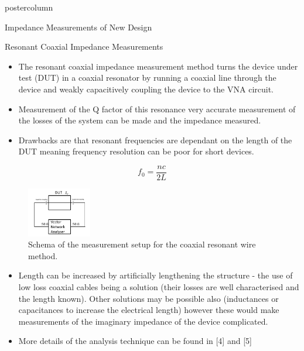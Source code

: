 \documentclass[final,hyperref={pdfpagelabels=false}]{beamer}
\begin{document}
\begin{frame}
\begin{columns}
\begin{column}{.49\textwidth}
\begin{beamercolorbox}[center,wd=\textwidth]{postercolumn}
\begin{minipage}[T]{.95\textwidth}
{\begin{block}{Impedance Measurements of New Design}
\end{block}
\vfill
\begin{block}{Resonant Coaxial Impedance Measurements}
\begin{itemize}
\item{The resonant coaxial impedance measurement method turns the device under test (DUT) in a coaxial resonator by running a coaxial line through the device and weakly capacitively coupling the device to the VNA circuit.}
\item{Measurement of the Q factor of this resonance very accurate measurement of the losses of the system can be made and the impedance measured.} 
\item{Drawbacks are that resonant frequencies are dependant on the length of the DUT meaning frequency resolution can be poor for short devices.}
\end{itemize}
\begin{equation}
f_{0} = \frac{nc}{2L}
\end{equation}
\begin{figure}
\includegraphics[width=0.25\textwidth]{figures/wire_meas_single_wire.pdf}
\caption{Schema of the measurement setup for the coaxial resonant wire method.}
\label{fig:measResonantMethod}
\end{figure}
\begin{itemize}
\item{Length can be increased by artificially lengthening the structure - the use of low loss coaxial cables being a solution (their losses are well characterised and the length known). Other solutions may be possible also (inductances or capacitances to increase the electrical length) however these would make measurements of the imaginary impedance of the device complicated.}
\item{More details of the analysis technique can be found in [4] and [5]}
\end{itemize}
\begin{figure}
\end{figure}
\end{block}}
\end{minipage}
\end{beamercolorbox}
\end{column}
\end{columns}
\end{frame}
\end{document}
